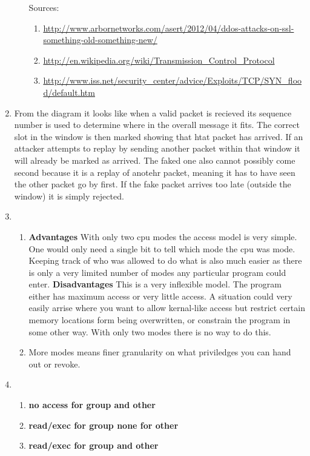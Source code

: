 \documentclass{article}
\begin{document}
\begin{enumerate}
\begin{enumerate}
      Sources:
      \tiny
      \begin{enumerate}
      \item \url{http://www.arbornetworks.com/asert/2012/04/ddos-attacks-on-ssl-something-old-something-new/}
      \item \url{http://en.wikipedia.org/wiki/Transmission_Control_Protocol}
      \item \url{http://www.iss.net/security_center/advice/Exploits/TCP/SYN_flood/default.htm}
      \end{enumerate}
      \normalsize
    \end{enumerate}

  \item
    From the diagram it looks like when a valid packet is recieved its sequence number is used to determine where in the overall message it fits. The correct slot in the window is then marked showing that htat packet has arrived. If an attacker attempts to replay by sending another packet within that window it will already be marked as arrived. The faked one also cannot possibly come second because it is a replay of anotehr packet, meaning it has to have seen the other packet go by first. If the fake packet arrives too late (outside the window) it is simply rejected.

  \item
    \begin{enumerate}
    \item
      {\bf Advantages} With only two cpu modes the access model is very simple. One would only need a single bit to tell which mode the cpu was mode. Keeping track of who was allowed to do what is also much easier as there is only a very limited number of modes any particular program could enter.
      {\bf Disadvantages} This is a very inflexible model. The program either has maximum access or very little access. A situation could very easily arrise where you want to allow kernal-like access but restrict certain memory locations form being overwritten, or constrain the program in some other way. With only two modes there is no way to do this.
    \item
      More modes means finer granularity on what priviledges you can hand out or revoke.
    \end{enumerate}

  \item
    \begin{enumerate}
    \item
      {\bf no access for group and other}
    \item
      {\bf read/exec for group none for other}
    \item
      {\bf read/exec for group and other}
    \end{enumerate}
\end{enumerate}
\end{document}

